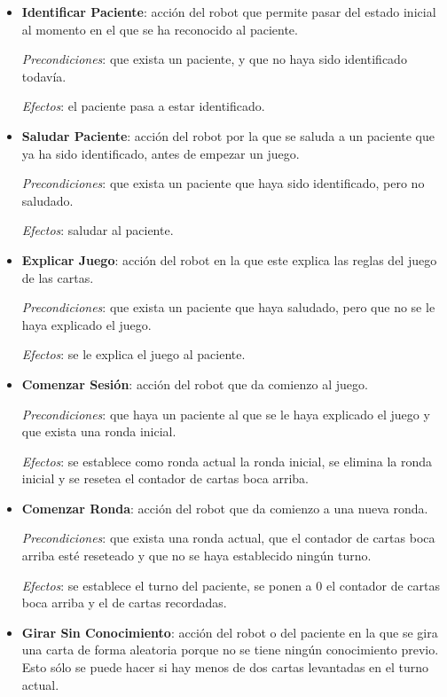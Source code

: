 \documentclass{uc3mpracticas}
\begin{document}
  \begin{itemize}
    \item \textbf{Identificar Paciente}: acción del robot que permite pasar del estado inicial al momento en el que se ha reconocido al paciente.

      \textit{Precondiciones}: que exista un paciente, y que no haya sido identificado todavía.

      \textit{Efectos}: el paciente pasa a estar identificado.

    \item \textbf{Saludar Paciente}: acción del robot por la que se saluda a un paciente que ya ha sido identificado, antes de empezar un juego.

      \textit{Precondiciones}: que exista un paciente que haya sido identificado, pero no saludado.

      \textit{Efectos}: saludar al paciente.

    \item \textbf{Explicar Juego}: acción del robot en la que este explica las reglas del juego de las cartas.

      \textit{Precondiciones}: que exista un paciente que haya saludado, pero que no se le haya explicado el juego.

      \textit{Efectos}: se le explica el juego al paciente.

    \item \textbf{Comenzar Sesión}: acción del robot que da comienzo al juego.

      \textit{Precondiciones}: que haya un paciente al que se le haya explicado el juego y que exista una ronda inicial.

      \textit{Efectos}: se establece como ronda actual la ronda inicial, se elimina la ronda inicial y se resetea el contador de cartas boca arriba.

    \item \textbf{Comenzar Ronda}: acción del robot que da comienzo a una nueva ronda.

      \textit{Precondiciones}: que exista una ronda actual, que el contador de cartas boca arriba esté reseteado y que no se haya establecido ningún turno.

      \textit{Efectos}: se establece el turno del paciente, se ponen a 0 el contador de cartas boca arriba y el de cartas recordadas.

    \item \textbf{Girar Sin Conocimiento}: acción del robot o del paciente en la que se gira una carta de forma aleatoria porque no se tiene ningún conocimiento previo. Esto sólo se puede hacer si hay menos de dos cartas levantadas en el turno actual.


\end{itemize}
\end{document}
